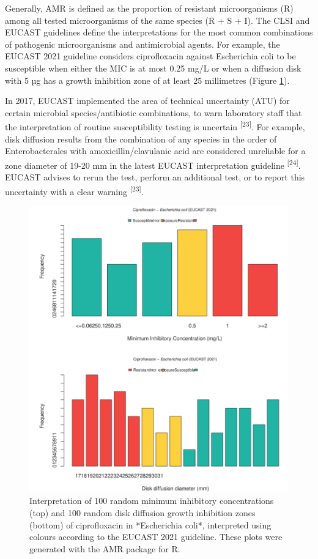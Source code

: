 \documentclass[
]{book}
\begin{document}
Generally, AMR is defined as the proportion of resistant microorganisms (R) among all tested microorganisms of the same species (R + S + I). The CLSI and EUCAST guidelines define the interpretations for the most common combinations of pathogenic microorganisms and antimicrobial agents. For example, the EUCAST 2021 guideline considers ciprofloxacin against Escherichia coli to be susceptible when either the MIC is at most 0.25 mg/L or when a diffusion disk with 5 µg has a growth inhibition zone of at least 25 millimetres (Figure \ref{fig:fig1-3}).

In 2017, EUCAST implemented the area of technical uncertainty (ATU) for certain microbial species/antibiotic combinations, to warn laboratory staff that the interpretation of routine susceptibility testing is uncertain \textsuperscript{{[}23{]}}. For example, disk diffusion results from the combination of any species in the order of Enterobacterales with amoxicillin/clavulanic acid are considered unreliable for a zone diameter of 19-20 mm in the latest EUCAST interpretation guideline \textsuperscript{{[}24{]}}. EUCAST advises to rerun the test, perform an additional test, or to report this uncertainty with a clear warning \textsuperscript{{[}23{]}}.

\begin{figure}

{\centering \includegraphics[width=1\linewidth]{images/01-03} 

}

\caption{Interpretation of 100 random minimum inhibitory concentrations (top) and 100 random disk diffusion growth inhibition zones (bottom) of ciprofloxacin in *Escherichia coli*, interpreted using colours according to the EUCAST 2021 guideline. These plots were generated with the AMR package for R.}\label{fig:fig1-3}
\end{figure}
\end{document}
